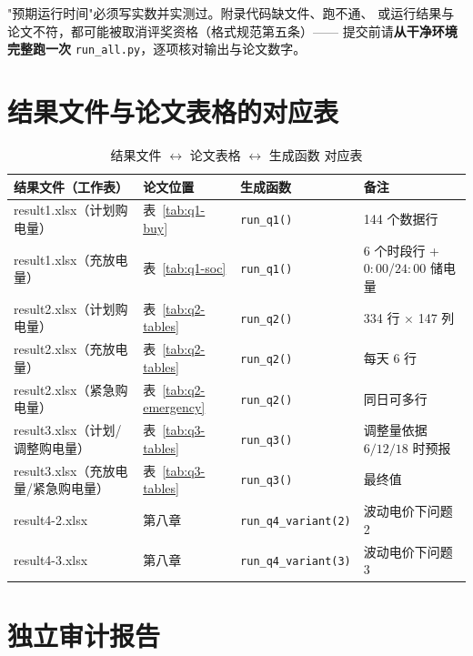 \begin{guideblock}
"预期运行时间"必须写实数并实测过。附录代码缺文件、跑不通、
或运行结果与论文不符，都可能被取消评奖资格（格式规范第五条）——
提交前请\textbf{从干净环境完整跑一次} \texttt{run\_all.py}，逐项核对输出与论文数字。
\end{guideblock}

\section{结果文件与论文表格的对应表}

\begin{table}[htbp]
  \centering
  \caption{结果文件 \(\leftrightarrow\) 论文表格 \(\leftrightarrow\) 生成函数 对应表}
  \label{tab:filemap}
  \footnotesize
  \begin{tabularx}{\linewidth}{L{2.8cm} L{2.8cm} L{3.6cm} Y}
    \toprule
    结果文件（工作表） & 论文位置 & 生成函数 & 备注 \\
    \midrule
    result1.xlsx（计划购电量） & 表~\ref{tab:q1-buy} & \texttt{run\_q1()} & 144 个数据行 \\
    result1.xlsx（充放电量） & 表~\ref{tab:q1-soc} & \texttt{run\_q1()} & 6 个时段行 + \(0{:}00\)/\(24{:}00\) 储电量 \\
    result2.xlsx（计划购电量） & 表~\ref{tab:q2-tables} & \texttt{run\_q2()} & 334 行 \(\times\) 147 列 \\
    result2.xlsx（充放电量） & 表~\ref{tab:q2-tables} & \texttt{run\_q2()} & 每天 6 行 \\
    result2.xlsx（紧急购电量） & 表~\ref{tab:q2-emergency} & \texttt{run\_q2()} & 同日可多行 \\
    result3.xlsx（计划/调整购电量） & 表~\ref{tab:q3-tables} & \texttt{run\_q3()} & 调整量依据 \(6/12/18\) 时预报 \\
    result3.xlsx（充放电量/紧急购电量） & 表~\ref{tab:q3-tables} & \texttt{run\_q3()} & 最终值 \\
    result4-2.xlsx & 第八章 & \texttt{run\_q4\_variant(2)} & 波动电价下问题 2 \\
    result4-3.xlsx & 第八章 & \texttt{run\_q4\_variant(3)} & 波动电价下问题 3 \\
    \bottomrule
  \end{tabularx}
\end{table}

\section{独立审计报告}

